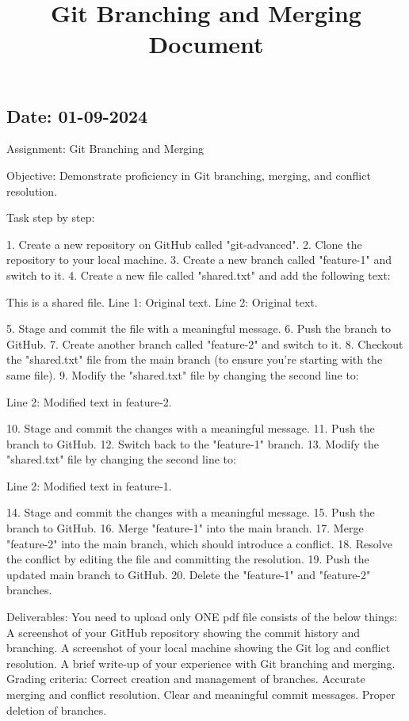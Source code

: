 \documentclass[12pt]{article}
\begin{document}
\subsection*{Date: 01-09-2024}
\title{Git Branching and Merging{} Document}
Assignment: Git Branching and Merging

Objective: Demonstrate proficiency in Git branching, merging, and conflict resolution.

Task step by step:

1. Create a new repository on GitHub called "git-advanced".
2. Clone the repository to your local machine.
3. Create a new branch called "feature-1" and switch to it.
4. Create a new file called "shared.txt" and add the following text:

This is a shared file.
Line 1: Original text.
Line 2: Original text.

5. Stage and commit the file with a meaningful message.
6. Push the branch to GitHub.
7. Create another branch called "feature-2" and switch to it.
8. Checkout the "shared.txt" file from the main branch (to ensure you're starting with the same file).
9. Modify the "shared.txt" file by changing the second line to:

Line 2: Modified text in feature-2.

10. Stage and commit the changes with a meaningful message.
11. Push the branch to GitHub.
12. Switch back to the "feature-1" branch.
13. Modify the "shared.txt" file by changing the second line to:

Line 2: Modified text in feature-1.

14. Stage and commit the changes with a meaningful message.
15. Push the branch to GitHub.
16. Merge "feature-1" into the main branch.
17. Merge "feature-2" into the main branch, which should introduce a conflict.
18. Resolve the conflict by editing the file and committing the resolution.
19. Push the updated main branch to GitHub.
20. Delete the "feature-1" and "feature-2" branches.

Deliverables:
You need to upload only ONE pdf file consists of the below things:
A screenshot of your GitHub repository showing the commit history and branching.
A screenshot of your local machine showing the Git log and conflict resolution.
A brief write-up of your experience with Git branching and merging.
Grading criteria:
Correct creation and management of branches.
Accurate merging and conflict resolution.
Clear and meaningful commit messages.
Proper deletion of branches.
\newpage
\end{document}

